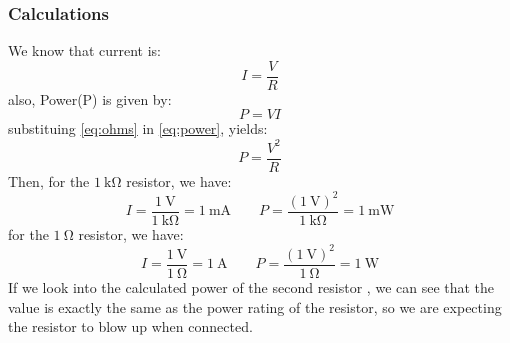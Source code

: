 \documentclass[a4paper]{article}
\begin{document}
\subsubsection{Calculations}
We know that current is:
\begin{equation}I=\frac{V}{R}\label{eq:ohms}\end{equation}
also, Power(P) is given by: 
\begin{equation}P=VI\label{eq:power}\end{equation}
substituing \ref{eq:ohms} in \ref{eq:power}, yields:
\begin{equation}P=\frac{V^2}{R}\label{eq:power2}\end{equation}
Then, for the $\SI{1}{\kilo\ohm}$ resistor, we have:
\[I=\frac{\SI{1}{\volt}}{\SI{1}{\kilo\ohm}}=\SI{1}{\milli\ampere}
\qquad P=\frac{(\SI{1}{\volt})^2}{\SI{1}{\kilo\ohm}}=\SI{1}{\milli\watt}\]
for the $\SI{1}{\ohm}$ resistor, we have:
\[I=\frac{\SI{1}{\volt}}{\SI{1}{\ohm}}=\SI{1}{\ampere}
\qquad P=\frac{(\SI{1}{\volt})^2}{\SI{1}{\ohm}}=\SI{1}{\watt}\]
If we look into the calculated power of the second resistor , we can see that the value is exactly the same
as the power rating of the resistor, so we are expecting the resistor to blow up when connected.
\end{document}
